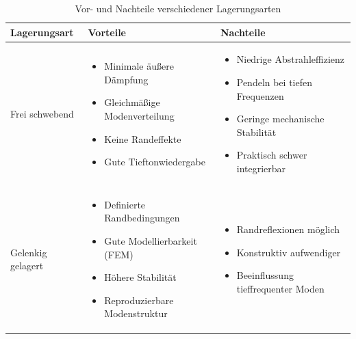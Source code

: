 \begin{table}[htbp]
\centering
\caption{Vor- und Nachteile verschiedener Lagerungsarten}
\label{tab:lagerungsarten}
\footnotesize
\setlength{\tabcolsep}{3pt}
\renewcommand{\arraystretch}{1.3}
\begin{tabularx}{\textwidth}{|X|X|X|}
\hline
\textbf{Lagerungsart} & \textbf{Vorteile} & \textbf{Nachteile} \\
\hline
Frei schwebend &
\vspace{-2mm}
\begin{itemize}[leftmargin=*, nosep, topsep=0pt, parsep=0pt]
    \item Minimale äußere Dämpfung
    \item Gleichmäßige Modenverteilung
    \item Keine Randeffekte
    \item Gute Tieftonwiedergabe
\end{itemize}
\vspace{-2mm}
&
\vspace{-2mm}
\begin{itemize}[leftmargin=*, nosep, topsep=0pt, parsep=0pt]
    \item Niedrige Abstrahleffizienz
    \item Pendeln bei tiefen Frequenzen
    \item Geringe mechanische Stabilität
    \item Praktisch schwer integrierbar
\end{itemize}
\vspace{-2mm} \\
\hline
Gelenkig gelagert &
\vspace{-2mm}
\begin{itemize}[leftmargin=*, nosep, topsep=0pt, parsep=0pt]
    \item Definierte Randbedingungen
    \item Gute Modellierbarkeit (FEM)
    \item Höhere Stabilität
    \item Reproduzierbare Modenstruktur
\end{itemize}
\vspace{-2mm}
&
\vspace{-2mm}
\begin{itemize}[leftmargin=*, nosep, topsep=0pt, parsep=0pt]
    \item Randreflexionen möglich
    \item Konstruktiv aufwendiger
    \item Beeinflussung tieffrequenter Moden

\end{itemize}
\end{tabularx}
\end{table}
